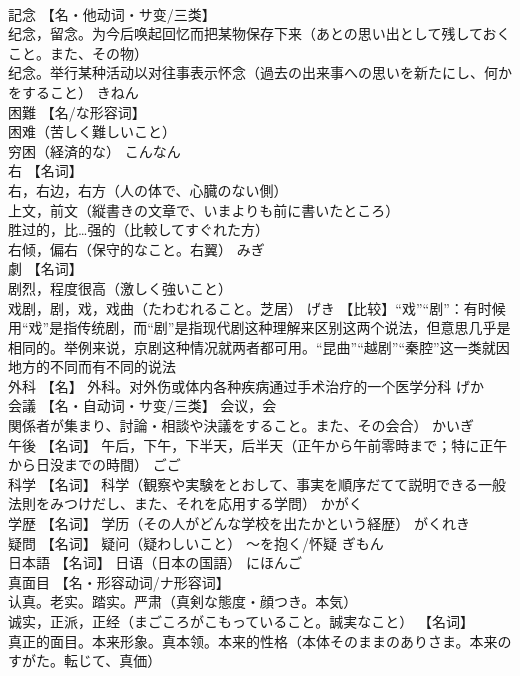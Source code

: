 \documentclass[8pt]{extreport}
\begin{document}
\begin{CJK}{UTF8}{min}
\\	記念	【名・他动词・サ变/三类】 
\\	纪念，留念。为今后唤起回忆而把某物保存下来（あとの思い出として残しておくこと。また、その物） 
\\	纪念。举行某种活动以对往事表示怀念（過去の出来事への思いを新たにし、何かをすること）	きねん	
\\	困難	【名/な形容词】 
\\	困难（苦しく難しいこと） 
\\	穷困（経済的な）	こんなん	
\\	右	【名词】 
\\	右，右边，右方（人の体で、心臓のない側） 
\\	上文，前文（縦書きの文章で、いまよりも前に書いたところ） 
\\	胜过的，比…强的（比較してすぐれた方） 
\\	右倾，偏右（保守的なこと。右翼）	みぎ	
\\	劇	【名词】 
\\	剧烈，程度很高（激しく強いこと） 
\\	戏剧，剧，戏，戏曲（たわむれること。芝居）	げき	【比较】“戏”“剧”：有时候用“戏”是指传统剧，而“剧”是指现代剧这种理解来区别这两个说法，但意思几乎是相同的。举例来说，京剧这种情况就两者都可用。“昆曲”“越剧”“秦腔”这一类就因地方的不同而有不同的说法
\\	外科	【名】 外科。对外伤或体内各种疾病通过手术治疗的一个医学分科	げか	
\\	会議	【名・自动词・サ变/三类】 会议，会
\\	関係者が集まり、討論・相談や決議をすること。また、その会合）	かいぎ	
\\	午後	【名词】 午后，下午，下半天，后半天（正午から午前零時まで；特に正午から日没までの時間）	ごご	
\\	科学	【名词】 科学（観察や実験をとおして、事実を順序だてて説明できる一般法則をみつけだし、また、それを応用する学問）	かがく	
\\	学歴	【名词】 学历（その人がどんな学校を出たかという経歴）	がくれき	
\\	疑問	【名词】 疑问（疑わしいこと） ～を抱く/怀疑	ぎもん	
\\	日本語	【名词】 日语（日本の国語）	にほんご	
\\	真面目	【名・形容动词/ナ形容词】 
\\	认真。老实。踏实。严肃（真剣な態度・顔つき。本気） 
\\	诚实，正派，正经（まごころがこもっていること。誠実なこと） 【名词】 
\\	真正的面目。本来形象。真本领。本来的性格（本体そのままのありさま。本来のすがた。転じて、真価） 

\end{CJK}
\end{document}
